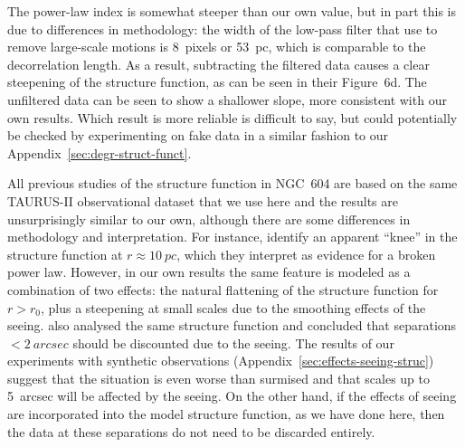 \documentclass[fleqn,usenatbib, useAMS, a4paper]{mnras}
\newcommand\stopNEW{\color{black}}
\begin{document}
The power-law index is somewhat steeper than our own value,
but in part this is due to differences in methodology:
the width of the low-pass filter that \citeauthor{lagrois2011} use to remove large-scale
motions is \SI{8}{pixels} or \SI{53}{pc}, which is comparable to the decorrelation length.
As a result, subtracting the filtered data causes a clear steepening of the structure function,
as can be seen in their Figure~6d.
The unfiltered data can be seen to show a shallower slope, more consistent
with our own results.
Which result is more reliable is difficult to say, but could potentially be checked
by experimenting on fake data in a similar fashion to our Appendix~\ref{sec:degr-struct-funct}. 

All previous studies of the structure function in NGC~604 are based
on the same TAURUS-II observational dataset that we use here
\citep{sabalisck1995supersonic}
and the results are unsurprisingly similar to our own,
although there are some differences in methodology and interpretation.
For instance, \citet{Medina-Tanco:1997a} identify an apparent ``knee''
in the structure function at \(r \approx \SI{10}{pc}\), which they interpret as
evidence for a broken power law.
However, in our own results the same feature is modeled as a combination
of two effects:
the natural flattening of
the structure function for \(r > r_0\),
plus a steepening at small scales due to the smoothing effects of the seeing. 
\citet{Melnick:2021x} also analysed the same structure function and concluded that
separations \(< \SI{2}{arcsec}\) should be discounted due to the seeing.
The results of our experiments with synthetic observations (Appendix~\ref{sec:effects-seeing-struc})
suggest that the situation is even worse than \citeauthor{Melnick:2021x} surmised
and that scales up to \SI{5}{arcsec} will be affected by the seeing.
On the other hand, if the effects of seeing are incorporated into the model structure function,
as we have done here, then the data at these separations do not need to be discarded entirely. 


\stopNEW




%
\bsp	%
\label{lastpage}
\end{document}
